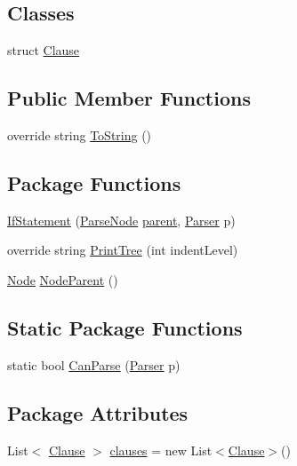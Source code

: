 \subsection*{Classes}
\begin{DoxyCompactItemize}
\item 
struct \hyperlink{a00025}{Clause}
\end{DoxyCompactItemize}
\subsection*{Public Member Functions}
\begin{DoxyCompactItemize}
\item 
override string \hyperlink{a00063_a18c67cb16090d0889bb9d6c8c6c565f8}{To\-String} ()
\end{DoxyCompactItemize}
\subsection*{Package Functions}
\begin{DoxyCompactItemize}
\item 
\hyperlink{a00043_ae534078389e8663edf7660403acf3cbc}{If\-Statement} (\hyperlink{a00063}{Parse\-Node} \hyperlink{a00063_af313a82103fcc2ff5a177dbb06b92f7b}{parent}, \hyperlink{a00064}{Parser} p)
\item 
override string \hyperlink{a00043_a5494c1daef8e0f3ac3ab68f91db4f332}{Print\-Tree} (int indent\-Level)
\item 
\hyperlink{a00054}{Node} \hyperlink{a00063_a580e520a29444fc23ac3660cbe514a09}{Node\-Parent} ()
\end{DoxyCompactItemize}
\subsection*{Static Package Functions}
\begin{DoxyCompactItemize}
\item 
static bool \hyperlink{a00043_afd6b96e1a27872701c4e6832f17fc3ce}{Can\-Parse} (\hyperlink{a00064}{Parser} p)
\end{DoxyCompactItemize}
\subsection*{Package Attributes}
\begin{DoxyCompactItemize}
\item 
List$<$ \hyperlink{a00025}{Clause} $>$ \hyperlink{a00043_a679b1a21582c78ed06df36bccc9c3cbc}{clauses} = new List$<$\hyperlink{a00025}{Clause}$>$()
\end{DoxyCompactItemize}


